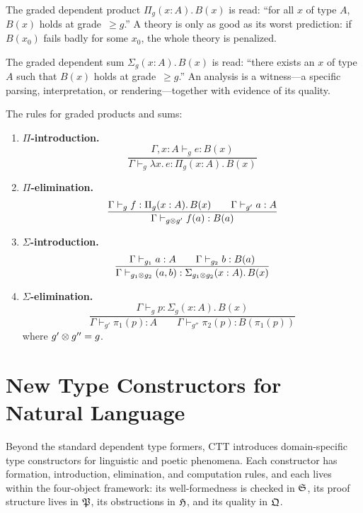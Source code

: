 \begin{remark}
The graded dependent product $\Pi_g(x : A).\, B(x)$ is read:
``for all $x$ of type $A$, $B(x)$ holds at grade~$\geq g$.''  A theory
is only as good as its worst prediction: if $B(x_0)$ fails badly for some
$x_0$, the whole theory is penalized.

The graded dependent sum $\Sigma_g(x : A).\, B(x)$ is read: ``there
exists an $x$ of type $A$ such that $B(x)$ holds at grade~$\geq g$.''
An analysis is a witness---a specific parsing, interpretation, or
rendering---together with evidence of its quality.
\end{remark}

The rules for graded products and sums:

\begin{definition}
\label{def:pi-sigma-rules}
\leavevmode
\begin{enumerate}[label=(\alph*)]
\item \textbf{$\Pi$-introduction.}
  \[
    \frac{\Gamma, x : A \vdash_g e : B(x)}{
      \Gamma \vdash_g \lambda x.\, e : \Pi_g(x:A).\, B(x)}
  \]
\item \textbf{$\Pi$-elimination.}
  \[
    \frac{\Gamma \vdash_g f : \Pi_g(x:A).\, B(x) \qquad
      \Gamma \vdash_{g'} a : A}{
      \Gamma \vdash_{g \otimes g'} f(a) : B(a)}
  \]
\item \textbf{$\Sigma$-introduction.}
  \[
    \frac{\Gamma \vdash_{g_1} a : A \qquad
      \Gamma \vdash_{g_2} b : B(a)}{
      \Gamma \vdash_{g_1 \otimes g_2} (a, b) :
      \Sigma_{g_1 \otimes g_2}(x:A).\, B(x)}
  \]
\item \textbf{$\Sigma$-elimination.}
  \[
    \frac{\Gamma \vdash_g p : \Sigma_g(x:A).\, B(x)}{
      \Gamma \vdash_{g'} \pi_1(p) : A \qquad
      \Gamma \vdash_{g''} \pi_2(p) : B(\pi_1(p))}
  \]
  where $g' \otimes g'' = g$.
\end{enumerate}
\end{definition}

\section{New Type Constructors for Natural Language}
\label{sec:nl-constructors}

Beyond the standard dependent type formers, CTT introduces
domain-specific type constructors for linguistic and poetic phenomena.
Each constructor has formation, introduction, elimination, and
computation rules, and each lives within the four-object framework:
its well-formedness is checked in $\mathfrak{S}$, its proof structure
lives in $\mathfrak{P}$, its obstructions in $\mathfrak{H}$, and its quality
in $\mathfrak{Q}$.

